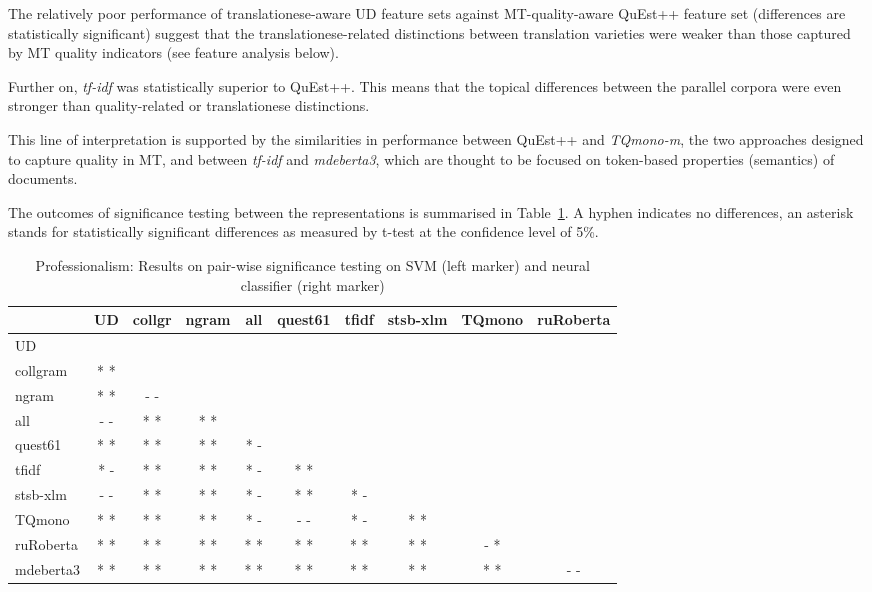 The relatively poor performance of translationese-aware UD feature sets against MT-quality-aware QuEst++ feature set (differences are statistically significant) suggest that the translationese-related distinctions between translation varieties were weaker than those captured by MT quality indicators (see feature analysis below).

Further on, \textit{tf-idf} was statistically superior to QuEst++. This means that the topical differences between the parallel corpora were even stronger than quality-related or translationese distinctions.

This line of interpretation is supported by the similarities in performance between QuEst++ and \textit{TQmono-m}, the two approaches designed to capture quality in MT, and between \textit{tf-idf} and \textit{mdeberta3}, which are thought to be focused on token-based properties (semantics) of documents. 

The outcomes of significance testing between the representations is summarised in Table~\ref{tab:sign_tests_vars}. A hyphen indicates no differences, an asterisk stands for statistically significant differences as measured by t-test at the confidence level of 5\%.
\begin{table}[H]
	\centering
	\begin{tabular}{l|ccccccccc}
		\toprule
                		& UD  & collgr & ngram & all & quest61 & tfidf & stsb-xlm & TQmono & ruRoberta \\
                \midrule
		UD              &     &          &       &     &    &       &              &          & \\
		collgram        & * * &          &       &     &    &       &              &         & \\
		ngram           & * * & - -      &       &     &    &       &              &          & \\
		all             & - - & * *      & * *   &     &    &       &              &         & \\
		quest61         & * * & * *      & * *   & * - &    &       &              &          & \\
		tfidf           & * - & * *      & * *   & * - & * * &       &              &       & \\
		stsb-xlm        & - - & * *      & * *   & * - & * * & * -   &              &          & \\
		TQmono          & * * & * *      & * *   & * - & - - & * -   & * *          &         & \\
		ruRoberta       & * * & * *      & * *   & * * & * * & * *   & * *          & - *      & \\
		mdeberta3       & * * & * *      & * *   & * * & * * & * *   & * *          & * *  & - - \\
		\bottomrule
	\end{tabular}
	\caption{\label{tab:sign_tests_vars}Professionalism: Results on pair-wise significance testing on SVM (left marker) and neural classifier (right marker)}
\end{table}

